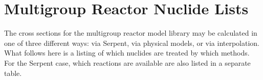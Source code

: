 \chapter{Multigroup Reactor Nuclide Lists}
\label{appendix_rmg_nuclide_lists}

The cross sections for the multigroup reactor model library may be calculated in one of three different ways: 
via Serpent, via physical models, or via interpolation.  What follows here is a listing of which nuclides
are treated by which methods.  For the Serpent case, which reactions are available are also listed in a 
separate table.

\vspace{1em}







\clearpage



